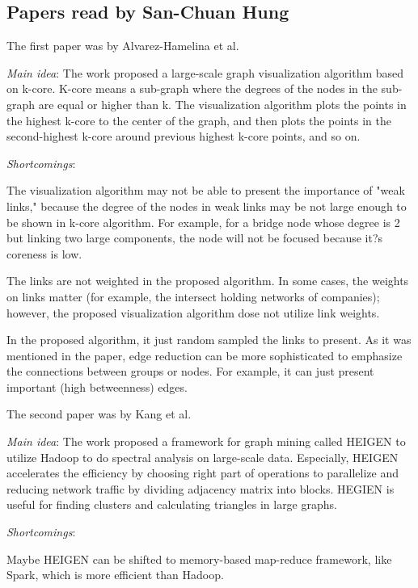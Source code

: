 \subsection{Papers read by San-Chuan Hung }
The first paper was by Alvarez-Hamelina et al.
\cite{AlvarezHamelin:2005vc}
\begin{itemize*}
\item {\em Main idea}: The work proposed a large-scale graph visualization algorithm based on k-core. K-core means a sub-graph where the degrees of the nodes in the sub-graph are equal or higher than k. The visualization algorithm plots the points in the highest k-core to the center of the graph, and then plots the points in the second-highest k-core around previous highest k-core points, and so on.
\item {\em Shortcomings}:
		\begin{itemize*}
		\item
			The visualization algorithm may not be able to present the importance of "weak links," because the degree of the nodes in weak links may be not large enough to be shown in k-core algorithm. For example, for a bridge node whose degree is 2 but linking two large components, the node will not be focused because it?s coreness is low.
		\item
			The links are not weighted in the proposed algorithm. In some cases, the weights on links matter (for example, the intersect holding networks of companies); however, the proposed visualization algorithm dose not utilize link weights.
		\item
			In the proposed algorithm, it just random sampled the links to present.  As it was mentioned in the paper, edge reduction can be more sophisticated to emphasize the connections between groups or nodes. For example, it can just present important (high betweenness) edges.
		\end{itemize*}
\end{itemize*}

The second paper was by Kang et al.
\cite{Kang:2011vk}
\begin{itemize*}
\item {\em Main idea}: The work proposed a framework for graph mining called HEIGEN to utilize Hadoop to do spectral analysis on large-scale data. Especially, HEIGEN accelerates the efficiency by choosing right part of operations to parallelize and reducing network traffic by dividing adjacency matrix into blocks. HEGIEN is useful for finding clusters and calculating triangles in large graphs.
\item {\em Shortcomings}:
		\begin{itemize*}
		\item
			Maybe HEIGEN can be shifted to memory-based map-reduce framework, like Spark, which is more efficient than Hadoop.
		\end{itemize*}
\end{itemize*}

